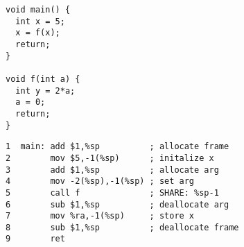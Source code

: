 \documentclass[acmsmall,review,anonymous]{acmart}\settopmatter{printfolios=true,printccs=false,printacmref=false}
\begin{document}
\newcommand{\mainpassc}{magenta}

\begin{figure}
  \centering
  \begin{subfigure}{.2\textwidth}
{\small
\begin{verbatim}
void main() {
  int x = 5;
  x = f(x);
  return;
}

void f(int a) {
  int y = 2*a;
  a = 0;
  return;
}
\end{verbatim}
}
  \end{subfigure}
  \begin{subfigure}{.6\textwidth}
{\small
\begin{verbatim}
1  main: add $1,%sp          ; allocate frame
2        mov $5,-1(%sp)      ; initalize x
3        add $1,%sp          ; allocate arg
4        mov -2(%sp),-1(%sp) ; set arg
5        call f              ; SHARE: %sp-1
6        sub $1,%sp          ; deallocate arg
7        mov %ra,-1(%sp)     ; store x
8        sub $1,%sp          ; deallocate frame
9        ret


\end{verbatim}}
\end{subfigure}
\end{figure}
\end{document}
